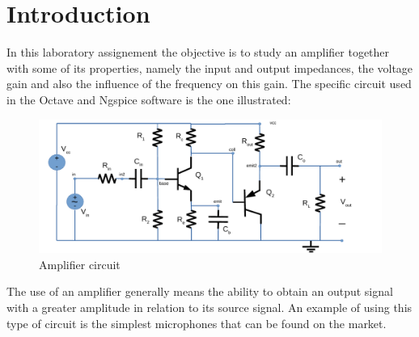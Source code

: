 \section{Introduction}
\label{sec:intro}


In this laboratory assignement the objective is to study an amplifier together with some of its properties, namely the input and output impedances, the voltage gain and also the influence of the frequency on this gain. The specific circuit used in the Octave and Ngspice software is the one illustrated:


\begin{figure} [!htb] 
  \includegraphics[width=\linewidth]{circuit.pdf}
  \caption{Amplifier circuit}
  \label{fig:theoplots}
  \endminipage\hfill
\end{figure}


The use of an amplifier generally means the ability to obtain an output signal with a greater amplitude in relation to its source signal. An example of using this type of circuit is the simplest microphones that can be found on the market.


